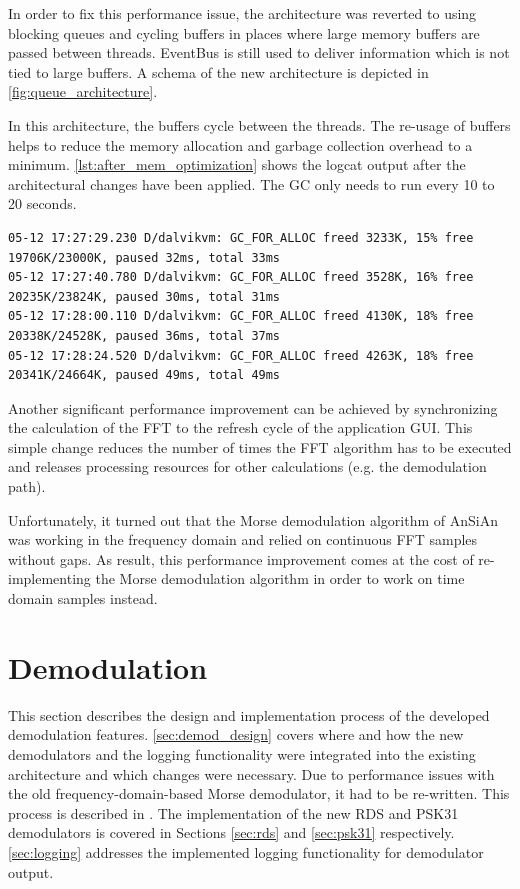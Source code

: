 In order to fix this performance issue, the architecture was reverted
to using blocking queues and cycling buffers in places where large memory buffers are passed
between threads. EventBus is still used to deliver information
which is not tied to large buffers. A schema of the new architecture
is depicted in \autoref{fig:queue_architecture}.

In this architecture, the buffers cycle between the threads. The re-usage
of buffers helps to reduce the memory allocation and garbage collection
overhead to a minimum. \autoref{lst:after_mem_optimization} shows the
logcat output after the architectural changes have been applied. The \ac{GC}
only needs to run every 10 to 20 seconds.


\begin{lstlisting}[label=lst:after_mem_optimization, caption=Logcat output
after memory optimizations, language=none]
05-12 17:27:29.230 D/dalvikvm: GC_FOR_ALLOC freed 3233K, 15% free 19706K/23000K, paused 32ms, total 33ms
05-12 17:27:40.780 D/dalvikvm: GC_FOR_ALLOC freed 3528K, 16% free 20235K/23824K, paused 30ms, total 31ms
05-12 17:28:00.110 D/dalvikvm: GC_FOR_ALLOC freed 4130K, 18% free 20338K/24528K, paused 36ms, total 37ms
05-12 17:28:24.520 D/dalvikvm: GC_FOR_ALLOC freed 4263K, 18% free 20341K/24664K, paused 49ms, total 49ms
\end{lstlisting}

Another significant performance improvement can be achieved by synchronizing
the calculation of the \ac{FFT} to the refresh cycle of the application
\ac{GUI}. This simple change reduces the number of times the \ac{FFT} algorithm
has to be executed and releases processing resources for other calculations
(e.g. the demodulation path). 

Unfortunately, it turned out that the Morse demodulation
algorithm of \ac{AnSiAn} was working in the frequency
domain and relied on continuous \ac{FFT} samples without gaps.
As result, this performance improvement comes at the cost of re-implementing
the Morse demodulation algorithm in order to work on time domain samples
instead.


\section{Demodulation}

This section describes the design and implementation process of the developed demodulation features. \autoref{sec:demod_design} covers where and how the new demodulators and the logging functionality were integrated into the existing architecture and which changes were necessary. Due to performance issues with the old frequency-domain-based Morse demodulator, it had to be re-written. This process is described in \label{sec:morse_demod}. The implementation of the new \ac{RDS} and \ac{PSK31} demodulators is covered in Sections \ref{sec:rds} and \ref{sec:psk31} respectively. \autoref{sec:logging} addresses the implemented logging functionality for demodulator output.


